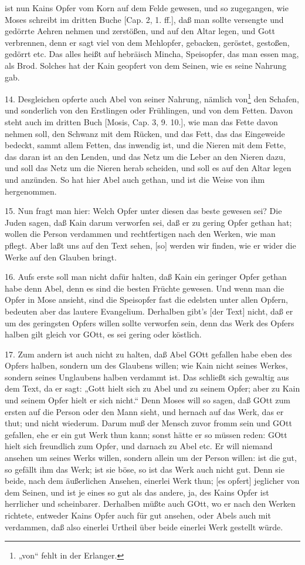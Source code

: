 ist nun Kains Opfer vom Korn auf dem Felde gewesen, und so zugegangen, wie Moses schreibt im dritten Buche [Cap. 2, 1. ff.], daß man sollte versengte und gedörrte Aehren nehmen und zerstößen, und auf den Altar legen, und Gott verbrennen, denn er sagt viel von dem Mehlopfer, gebacken, geröstet, gestoßen, gedörrt etc. Das alles heißt auf hebräisch Mincha, Speisopfer, das man essen mag, als Brod. Solches hat der Kain geopfert von dem Seinen, wie es seine Nahrung gab.

14. Desgleichen opferte auch Abel von seiner Nahrung, nämlich von\footnote{„von“ fehlt in der Erlanger.} den Schafen, und sonderlich von den Erstlingen oder Frühlingen, und von dem Fetten. Davon steht auch im dritten Buch [Mosis, Cap. 3, 9. 10.], wie man das Fette davon nehmen soll, den Schwanz mit dem Rücken, und das Fett, das das Eingeweide bedeckt, sammt allem Fetten, das inwendig ist, und die Nieren mit dem Fette, das daran ist an den Lenden, und das Netz um die Leber an den Nieren dazu, und soll das Netz um die Nieren herab scheiden, und soll es auf den Altar legen und anzünden. So hat hier Abel auch gethan, und ist die Weise von ihm hergenommen.

15. Nun fragt man hier: Welch Opfer unter diesen das beste gewesen sei? Die Juden sagen, daß Kain darum verworfen sei, daß er zu gering Opfer gethan hat; wollen die Person verdammen und rechtfertigen nach den Werken, wie man pflegt. Aber laßt uns auf den Text sehen, [so] werden wir finden, wie er wider die Werke auf den Glauben bringt.

16. Aufs erste soll man nicht dafür halten, daß Kain ein geringer Opfer gethan habe denn Abel, denn es sind die besten Früchte gewesen. Und wenn man die Opfer in Mose ansieht, sind die Speisopfer fast die edelsten unter allen Opfern, bedeuten aber das lautere Evangelium. Derhalben gibt’s [der Text] nicht, daß er um des geringsten Opfers willen sollte verworfen sein, denn das Werk des Opfers halben gilt gleich vor GOtt, es sei gering oder köstlich.

17. Zum andern ist auch nicht zu halten, daß Abel GOtt gefallen habe eben des Opfers halben, sondern um des Glaubens willen; wie Kain nicht seines Werkes, sondern seines Unglaubens halben verdammt ist. Das schließt sich gewaltig aus dem Text, da er sagt: „Gott hielt sich zu Abel und zu seinem Opfer; aber zu Kain und seinem Opfer hielt er sich nicht.“ Denn Moses will so sagen, daß GOtt zum ersten auf die Person oder den Mann sieht, und hernach auf das Werk, das er thut; und nicht wiederum. Darum muß der Mensch zuvor fromm sein und GOtt gefallen, ehe er ein gut Werk thun kann; sonst hätte er so müssen reden: GOtt hielt sich freundlich zum Opfer, und darnach zu Abel etc. Er will niemand ansehen um seines Werks willen, sondern allein um der Person willen: ist die gut, so gefällt ihm das Werk; ist sie böse, so ist das Werk auch nicht gut. Denn sie beide, nach dem äußerlichen Ansehen, einerlei Werk thun; [es opfert] jeglicher von dem Seinen, und ist je eines so gut als das andere, ja, des Kains Opfer ist herrlicher und scheinbarer. Derhalben müßte auch GOtt, wo er nach den Werken richtete, entweder Kains Opfer auch für gut ansehen, oder Abels auch mit verdammen, daß also einerlei Urtheil über beide einerlei Werk gestellt würde.

